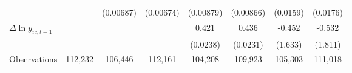 {\begin{tabular}{l*{7}{c}}
          &                  &(0.00687)         &(0.00674)         &(0.00879)         &(0.00866)         & (0.0159)         & (0.0176)         \\
[1em]
$\Delta \ln y_{ic,t-1}$&                  &                  &                  &    0.421\sym{***}&    0.436\sym{***}&   -0.452         &   -0.532         \\
          &                  &                  &                  & (0.0238)         & (0.0231)         &  (1.633)         &  (1.811)         \\
\hline
Observations&  112,232         &  106,446         &  112,161         &  104,208         &  109,923         &  105,303         &  111,018         \\
\hline\hline
\end{tabular}
}

